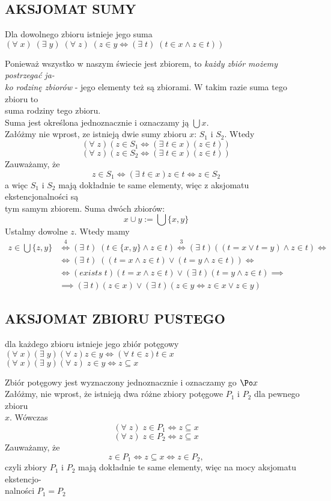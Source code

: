 \documentclass{article}
\begin{document}
\subsection{AKSJOMAT SUMY}
\begin{center}\large
    Dla dowolnego zbioru istnieje jego suma\smallskip\\
    $(\forall\;x)\;(\exists\;y)\;(\forall\;z)\;(z\in y\iff (\exists\;t)\;(t\in x\land z\in t))$
\end{center}\bigskip
Ponieważ wszystko w naszym świecie jest zbiorem, to \emph{\color{emp}każdy zbiór możemy postrzegać ja-\\ko rodzinę zbiorów} - jego elementy też są zbiorami. W takim razie suma tego zbioru to \\suma rodziny tego zbioru.\medskip\\
{\color{def}Suma jest określona jednoznacznie} i oznaczamy ją $\bigcup x$.\bigskip\\
\dowod
Załóżmy nie wprost, ze istnieją dwie sumy zbioru $x$: $S_1$ i $S_2$. Wtedy
$$(\forall\;z)(z\in S_1\iff (\exists\;t\in x) (z\in t))$$
$$(\forall\;z)(z\in S_2\iff (\exists\;t\in x) (z\in t))$$
Zauważamy, że
$$z\in S_1\iff (\exists\;t\in x)z\in t\iff z\in S_2$$
a więc $S_1$ i $S_2$ mają dokładnie te same elementy, więc z aksjomatu ekstencjonalności są \\tym samym zbiorem.
\kondow
Suma dwóch zbiorów:
$$x\cup y := \bigcup\{x, y\}$$
\dowod
Ustalmy dowolne $z$. Wtedy mamy
\begin{align*}
    z\in \bigcup\{z, y\}&\overset{4}\iff (\exists\;t)\;(t\in \{x, y\}\land z\in t)\overset{3}\iff (\exists\;t)((t=x\lor t=y)\land z\in t)\iff\\
    &\iff (\exists\;t)\;((t=x\land z\in t)\lor (t=y\land z\in t))\iff \\
    &\iff (exists\;t)(t=x\land z\in t)\lor(\exists\;t)(t=y\land z\in t)\implies\\
    &\implies (\exists\;t)(z\in x)\lor (\exists\;t)(z\in y\iff z\in x\lor z\in y)
\end{align*}
\kondow
\subsection{AKSJOMAT ZBIORU PUSTEGO}
\begin{center}\large
    dla każdego zbioru istnieje jego zbiór potęgowy\smallskip\\
    $(\forall\;x)(\exists\;y)(\forall\;z)z\in y\iff (\forall\;t\in z) t\in x$\smallskip\\
    $(\forall\;x)(\exists\;y)(\forall\;z) \;z\in y\iff z\subseteq x$
\end{center}\bigskip
Zbiór potęgowy jest wyznaczony jednoznacznie i oznaczamy go $\Po x$\medskip\\
\dowod
Załóżmy, nie wprost, że istnieją dwa różne zbiory potęgowe $P_1$ i $P_2$ dla pewnego zbioru \\$x$. Wówczas
$$(\forall\;z)\;z\in P_1\iff z\subseteq x$$
$$(\forall\;z)\;z\in P_2\iff z\subseteq x$$
Zauważamy, że
$$z\in P_1\iff z\subseteq x\iff z\in P_2,$$
czyli zbiory $P_1$ i $P_2$ mają dokładnie te same elementy, więc na mocy aksjomatu ekstencjo-\\nalności $P_1=P_2$
\kondow
\end{document}
